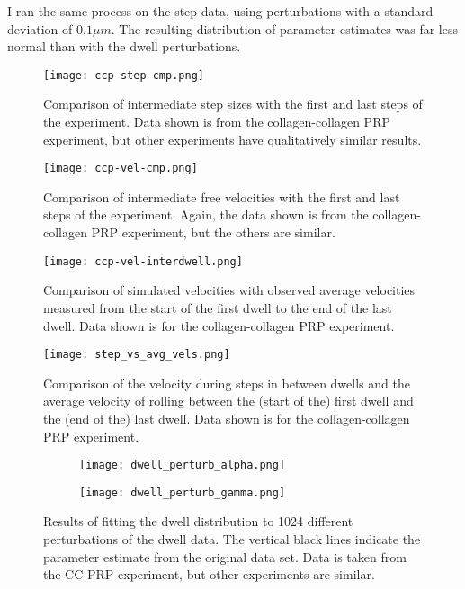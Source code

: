 \documentclass{article}
\begin{document}
I ran the same process on the step data, using perturbations with a
standard deviation of $0.1 \mu m$. The resulting distribution of
parameter estimates was far less normal than with the dwell
perturbations. 

\begin{figure}
  \centering
  \texttt{[image: ccp-step-cmp.png]}
  \caption{Comparison of intermediate step sizes with the first and
    last steps of the experiment. Data shown is from the
    collagen-collagen PRP experiment, but other experiments have
    qualitatively similar results.}
  \label{fig:ccp-step-cmp}
\end{figure}

\begin{figure}
  \centering
  \texttt{[image: ccp-vel-cmp.png]}
  \caption{Comparison of intermediate free velocities with the first
    and last steps of the experiment. Again, the data shown is from
    the collagen-collagen PRP experiment, but the others are similar.}
  \label{fig:ccp-vel-cmp}
\end{figure}

\begin{figure}
  \centering
  \texttt{[image: ccp-vel-interdwell.png]}
  \caption{Comparison of simulated velocities with observed average
    velocities measured from the start of the first dwell to the end
    of the last dwell. Data shown is for the collagen-collagen PRP
    experiment.}
  \label{fig:ccp-vel-interdwell}
\end{figure}

\begin{figure}
  \centering
  \texttt{[image: step\_vs\_avg\_vels.png]}
  \caption{Comparison of the velocity during steps in between dwells
    and the average velocity of rolling between the (start of the) first dwell and
    the (end of the) last dwell. Data shown is for the
    collagen-collagen PRP experiment.}
  \label{fig:step_vs_avg_vels}
\end{figure}

\begin{figure}
  \centering
  \begin{subfigure}{0.48\textwidth}
    \texttt{[image: dwell\_perturb\_alpha.png]}
  \end{subfigure}
  \hfill
  \begin{subfigure}{0.48\textwidth}
    \texttt{[image: dwell\_perturb\_gamma.png]}
  \end{subfigure}  
  \caption{Results of fitting the dwell distribution to 1024 different
    perturbations of the dwell data. The vertical black lines indicate
    the parameter estimate from the original data set. Data is taken
    from the CC PRP experiment, but other experiments are similar.}
  \label{fig:dwell_perturb}
\end{figure}
\end{document}
